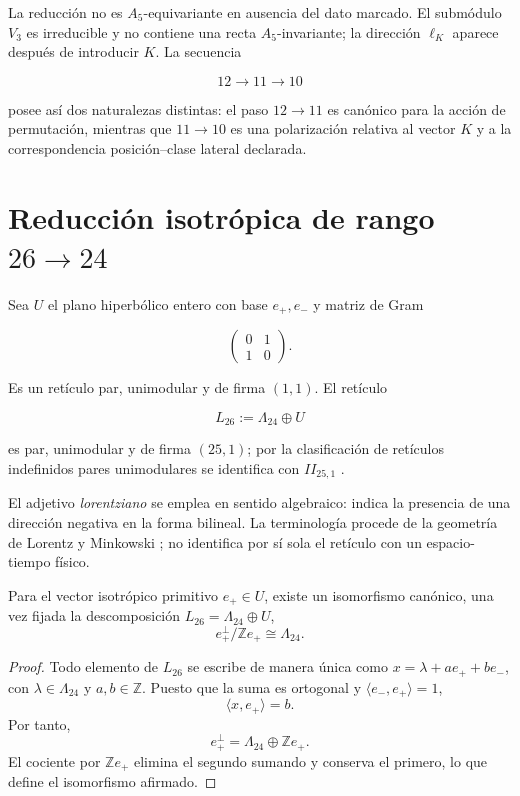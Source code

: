 La reducción no es \(A_5\)-equivariante en ausencia del dato marcado. El
submódulo \(V_3\) es irreducible y no contiene una recta \(A_5\)-invariante;
la dirección \(\ell_K\) aparece después de introducir \(K\). La secuencia

\[
12\longrightarrow11\longrightarrow10
\]

posee así dos naturalezas distintas: el paso \(12\to11\) es canónico para
la acción de permutación, mientras que \(11\to10\) es una polarización
relativa al vector \(K\) y a la correspondencia posición--clase lateral declarada.

\section{Reducción isotrópica de rango \(26\to24\)}
\label{sec:reduccion-26-24}

Sea \(U\) el plano hiperbólico entero con base \(e_+,e_-\) y matriz de Gram

\[
\begin{pmatrix}0&1\\1&0\end{pmatrix}.
\]

Es un retículo par, unimodular y de firma \((1,1)\). El retículo

\[
L_{26}:=\Lambda_{24}\oplus U
\]

es par, unimodular y de firma \((25,1)\); por la clasificación de retículos
indefinidos pares unimodulares se identifica con \(II_{25,1}\)
\cite{ConwaySloane1999}.

El adjetivo \emph{lorentziano} se emplea en sentido algebraico: indica la
presencia de una dirección negativa en la forma bilineal. La terminología
procede de la geometría de Lorentz y Minkowski
\cite{Lorentz1904,Minkowski1909}; no identifica por sí sola el retículo con
un espacio-tiempo físico.

\begin{theorem}
\label{thm:reduccion-nula}
Para el vector isotrópico primitivo \(e_+\in U\), existe un isomorfismo
canónico, una vez fijada la descomposición \(L_{26}=\Lambda_{24}\oplus U\),
\[
e_+^\perp/\mathbb Ze_+\cong\Lambda_{24}.
\]
\end{theorem}

\begin{proof}
Todo elemento de \(L_{26}\) se escribe de manera única como
\(x=\lambda+ae_++be_-\), con
\(\lambda\in\Lambda_{24}\) y \(a,b\in\mathbb Z\). Puesto que la suma es
ortogonal y \(\langle e_-,e_+\rangle=1\),
\[
\langle x,e_+\rangle=b.
\]
Por tanto,
\[
e_+^\perp=\Lambda_{24}\oplus\mathbb Ze_+.
\]
El cociente por \(\mathbb Ze_+\) elimina el segundo sumando y conserva el
primero, lo que define el isomorfismo afirmado.
\end{proof}

